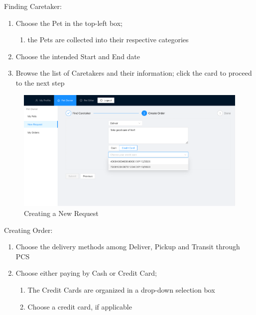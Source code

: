 \documentclass[
  paper=a4,
  ,captions=tableheading
]{scrartcl}
\providecommand{\tightlist}{%
  \setlength{\itemsep}{0pt}\setlength{\parskip}{0pt}}
\begin{document}
Finding Caretaker:

\begin{enumerate}
\def\labelenumi{\arabic{enumi}.}
\tightlist
\item
  Choose the Pet in the top-left box;

  \begin{enumerate}
  \def\labelenumii{\arabic{enumii}.}
  \tightlist
  \item
    the Pets are collected into their respective categories
  \end{enumerate}
\item
  Choose the intended Start and End date
\item
  Browse the list of Caretakers and their information; click the card to
  proceed to the next step
\end{enumerate}

\begin{figure}
\centering
\includegraphics{create-order.png}
\caption{Creating a New Request}
\end{figure}

Creating Order:

\begin{enumerate}
\def\labelenumi{\arabic{enumi}.}
\tightlist
\item
  Choose the delivery methods among Deliver, Pickup and Transit through
  PCS
\item
  Choose either paying by Cash or Credit Card;

  \begin{enumerate}
  \def\labelenumii{\arabic{enumii}.}
  \tightlist
  \item
    The Credit Cards are organized in a drop-down selection box
  \item
    Choose a credit card, if applicable
  \end{enumerate}
\end{enumerate}
\end{document}
